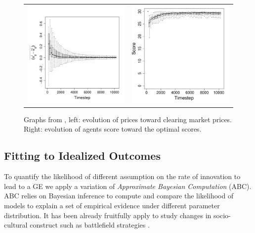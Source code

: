 \documentclass[a1paper,fontscale=.47]{baposter}
\begin{document}
\begin{poster}
{\begin{figure}[H]
	\begin{tabular}{cc}
		\includegraphics[width=.5\textwidth]{img/ClearingPriceDistanceEvolutionForTrade-G3N500.pdf}&
		\includegraphics[width=.45\textwidth]{img/ScoreEvolutionForTrade-G3N500.pdf} \\
	\end{tabular}
	\vspace{-.5cm}
	\caption{
	    \small
	    Graphs from \cite{carrignon2015modelingthecoevolutionoftradeandcultureinpastsocieties}, left: evolution of prices toward clearing market prices. Right: evolution of agents score toward the optimal scores.
	}
	\label{fig:ratioEvol}
\end{figure}


\subsection*{Fitting to Idealized Outcomes}

To quantify the likelihood of different assumption on the rate of innovation to lead to a GE we apply a variation of \emph{Approximate Bayesian Computation} (ABC). ABC relies on Bayesian inference to compute and compare the likelihood of models to explain a set of empirical evidence under different parameter distribution. It has been already fruitfully apply to study changes in socio-cultural construct such as battlefield strategies \cite{rubiocampillo2016modelselectioninhistoricalresearchusingapproximatebayesiancomputation}.

}
\end{poster}
\end{document}
